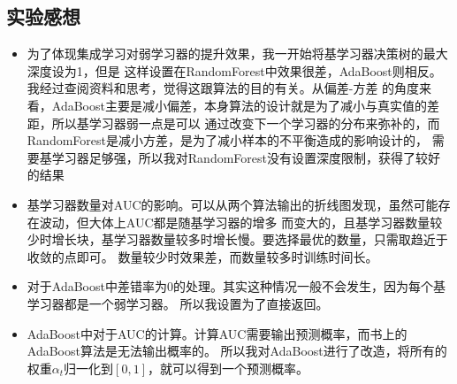 \documentclass{article}
\begin{document}
    \subsection{实验感想}
        \begin{itemize}
            \item 
                为了体现集成学习对弱学习器的提升效果，我一开始将基学习器决策树的最大深度设为1，但是
                这样设置在RandomForest中效果很差，AdaBoost则相反。我经过查阅资料和思考，觉得这跟算法的目的有关。从偏差-方差
                的角度来看，AdaBoost主要是减小偏差，本身算法的设计就是为了减小与真实值的差距，所以基学习器弱一点是可以
                通过改变下一个学习器的分布来弥补的，而RandomForest是减小方差，是为了减小样本的不平衡造成的影响设计的，
                需要基学习器足够强，所以我对RandomForest没有设置深度限制，获得了较好的结果
            \item 
                基学习器数量对AUC的影响。可以从两个算法输出的折线图发现，虽然可能存在波动，但大体上AUC都是随基学习器的增多
                而变大的，且基学习器数量较少时增长块，基学习器数量较多时增长慢。要选择最优的数量，只需取趋近于收敛的点即可。
                数量较少时效果差，而数量较多时训练时间长。
            \item 
                对于AdaBoost中差错率为0的处理。其实这种情况一般不会发生，因为每个基学习器都是一个弱学习器。
                所以我设置为了直接返回。
            \item 
                AdaBoost中对于AUC的计算。计算AUC需要输出预测概率，而书上的AdaBoost算法是无法输出概率的。
                所以我对AdaBoost进行了改造，将所有的权重$\alpha_t$归一化到$[0, 1]$，就可以得到一个预测概率。
        \end{itemize}
		
\end{document}
